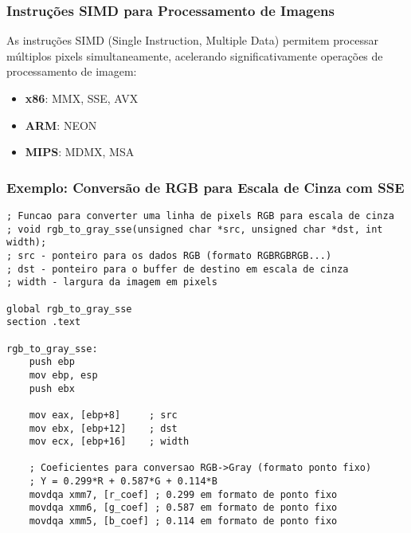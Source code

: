 \documentclass[11pt]{beamer}
\begin{document}
\begin{frame}
\frametitle{Instruções SIMD para Processamento de Imagens}

As instruções SIMD (Single Instruction, Multiple Data) permitem processar múltiplos pixels simultaneamente, acelerando significativamente operações de processamento de imagem:

\begin{itemize}
    \item \textbf{x86}: MMX, SSE, AVX
    \item \textbf{ARM}: NEON
    \item \textbf{MIPS}: MDMX, MSA
\end{itemize}

\end{frame}

\begin{frame}[fragile]
\frametitle{Exemplo: Conversão de RGB para Escala de Cinza com SSE}

\begin{lstlisting}[language={[x86masm]Assembler}, basicstyle=\tiny]
; Funcao para converter uma linha de pixels RGB para escala de cinza
; void rgb_to_gray_sse(unsigned char *src, unsigned char *dst, int width);
; src - ponteiro para os dados RGB (formato RGBRGBRGB...)
; dst - ponteiro para o buffer de destino em escala de cinza
; width - largura da imagem em pixels

global rgb_to_gray_sse
section .text

rgb_to_gray_sse:
    push ebp
    mov ebp, esp
    push ebx
    
    mov eax, [ebp+8]     ; src
    mov ebx, [ebp+12]    ; dst
    mov ecx, [ebp+16]    ; width
    
    ; Coeficientes para conversao RGB->Gray (formato ponto fixo)
    ; Y = 0.299*R + 0.587*G + 0.114*B
    movdqa xmm7, [r_coef] ; 0.299 em formato de ponto fixo
    movdqa xmm6, [g_coef] ; 0.587 em formato de ponto fixo
    movdqa xmm5, [b_coef] ; 0.114 em formato de ponto fixo
\end{lstlisting}

\end{frame}
\end{document}
